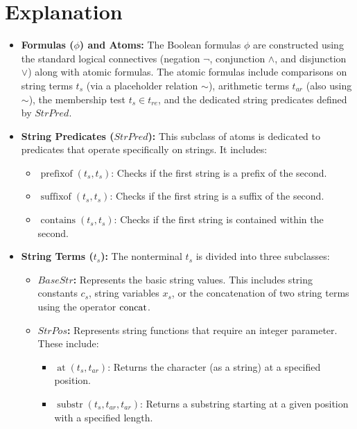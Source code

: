 \section*{Explanation}

\begin{itemize}
	\item \textbf{Formulas (\(\phi\)) and Atoms:}  
	The Boolean formulas \(\phi\) are constructed using the standard logical connectives (negation \(\lnot\), conjunction \(\land\), and disjunction \(\lor\)) along with atomic formulas. The atomic formulas include comparisons on string terms \( t_s \) (via a placeholder relation \(\sim\)), arithmetic terms \( t_{\mathit{ar}} \) (also using \(\sim\)), the membership test \( t_s \in t_{\mathit{re}} \), and the dedicated string predicates defined by \( StrPred \).
	
	\item \textbf{String Predicates (\(StrPred\)):}  
	This subclass of atoms is dedicated to predicates that operate specifically on strings. It includes:
	\begin{itemize}
		\item \(\operatorname{prefixof}(t_s, t_s)\): Checks if the first string is a prefix of the second.
		\item \(\operatorname{suffixof}(t_s, t_s)\): Checks if the first string is a suffix of the second.
		\item \(\operatorname{contains}(t_s, t_s)\): Checks if the first string is contained within the second.
	\end{itemize}
	
	\item \textbf{String Terms (\(t_s\)):}  
	The nonterminal \( t_s \) is divided into three subclasses:
	\begin{itemize}
		\item \textbf{\(BaseStr\):}  
		Represents the basic string values. This includes string constants \(c_s\), string variables \(x_s\), or the concatenation of two string terms using the operator \(\operatorname{concat}\).
		
		\item \textbf{\(StrPos\):}  
		Represents string functions that require an integer parameter. These include:
		\begin{itemize}
			\item \(\operatorname{at}(t_s, t_{\mathit{ar}})\): Returns the character (as a string) at a specified position.
			\item \(\operatorname{substr}(t_s, t_{\mathit{ar}}, t_{\mathit{ar}})\): Returns a substring starting at a given position with a specified length.
		\end{itemize}
		

\end{itemize}
\end{itemize}
